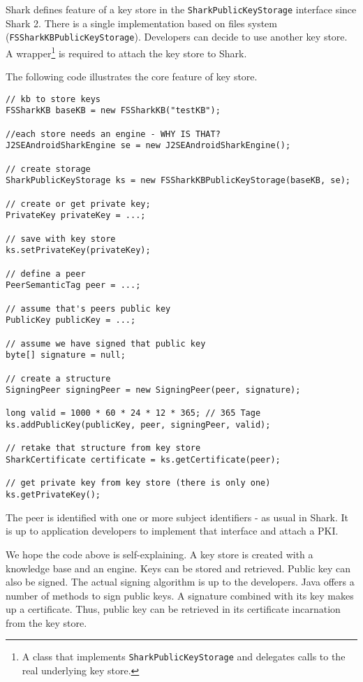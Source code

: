 Shark defines feature of a key store in the {\tt SharkPublicKeyStorage} interface since Shark 2. There is a single implementation based on files system ({\tt FSSharkKBPublicKeyStorage}). Developers can decide to use another key store. A wrapper\footnote{A class that implements {\tt SharkPublicKeyStorage} and delegates calls to the real underlying key store.} is required to attach the key store to Shark.

The following code illustrates the core feature of key store.

\begin{verbatim}
// kb to store keys
FSSharkKB baseKB = new FSSharkKB("testKB");

//each store needs an engine - WHY IS THAT?
J2SEAndroidSharkEngine se = new J2SEAndroidSharkEngine();

// create storage
SharkPublicKeyStorage ks = new FSSharkKBPublicKeyStorage(baseKB, se);

// create or get private key;
PrivateKey privateKey = ...;

// save with key store
ks.setPrivateKey(privateKey);

// define a peer
PeerSemanticTag peer = ...;

// assume that's peers public key
PublicKey publicKey = ...;

// assume we have signed that public key
byte[] signature = null;

// create a structure
SigningPeer signingPeer = new SigningPeer(peer, signature);

long valid = 1000 * 60 * 24 * 12 * 365; // 365 Tage
ks.addPublicKey(publicKey, peer, signingPeer, valid);

// retake that structure from key store
SharkCertificate certificate = ks.getCertificate(peer);

// get private key from key store (there is only one)
ks.getPrivateKey();
\end{verbatim}

The peer is identified with one or more subject identifiers - as usual in Shark.
It is up to application developers to implement that interface and attach a PKI.

We hope the code above is self-explaining. A key store is created with a knowledge base and an engine. Keys can be stored and retrieved. Public key can also be signed. The actual signing algorithm is up to the developers. Java offers a number of methods to sign public keys. A signature combined with its key makes up a certificate. Thus, public key can be retrieved in its certificate incarnation from the key store.

